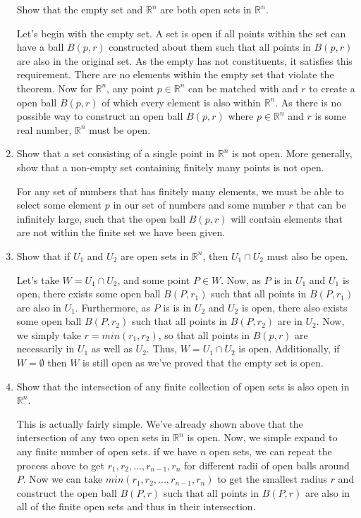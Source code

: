 \documentclass[11pt]{article}
\begin{document}
\begin{enumerate}[label=(\alph*)]
	Show that the empty set and $\mathbb{R}^n$ are both open sets in $\mathbb{R}^n$.
	
	Let's begin with the empty set. A set is open if all points within the set can have a ball $B(p,r)$ constructed about them such that all points in $B(p,r)$ are also in the original set. As the empty has not constituents, it satisfies this requirement. There are no elements within the empty set that violate the theorem. Now for $\mathbb{R}^n$, any point $p \in \mathbb{R}^n$ can be matched with and $r$ to create a open ball $B(p,r)$ of which every element is also within $\mathbb{R}^n$. As there is no possible way to construct an open ball $B(p,r)$ where $p \in \mathbb{R}^n$ and $r$ is some real number, $\mathbb{R}^n$ must be open.
	
	\item
	
	Show that a set consisting of a single point in $\mathbb{R}^n$ is not open. More generally, show that a non-empty set containing finitely many points is not open.
	
	For any set of numbers that has finitely many elements, we must be able to select some element $p$ in our set of numbers and some number $r$ that can be infinitely large, such that the open ball $B(p,r)$ will contain elements that are not within the finite set we have been given.
	
	\item
	
	Show that if $U_1$ and $U_2$ are open sets in $\mathbb{R}^n$, then $U_1 \cap U_2$ must also be open.
	
	Let's take $W = U_1 \cap U_2$, and some point $P \in W$. Now, as $P$ is in $U_1$ and $U_1$ is open, there exists some open ball $B(P,r_1)$ such that all points in $B(P,r_1)$  are also in $U_1$. Furthermore, as $P$ is is in $U_2$ and $U_2$ is open, there also exists some open ball $B(P,r_2)$ such that all points in $B(P,r_2)$ are in $U_2$. Now, we simply take $r = min(r_1,r_2)$, so that all points in $B(p,r)$ are necessarily in $U_1$ as well as $U_2$. Thus, $W = U_1 \cap U_2$ is open. Additionally, if $W = \emptyset$ then $W$ is still open as we've proved that the empty set is open.
	
	\item
	
	Show that the intersection of any finite collection of open sets is also open in $\mathbb{R}^n$.
	
	This is actually fairly simple. We've already shown above that the intersection of any two open sets in $\mathbb{R}^n$ is open. Now, we simple expand to any finite number of open sets. if we have $n$ open sets, we can repeat the process above to get $r_1,r_2,...,r_{n-1},r_n$ for different radii of open balls around $P$. Now we can take $min(r_1,r_2,...,r_{n-1},r_n)$ to get the smallest radius $r$ and construct the open ball $B(P,r)$ such that all points in $B(P,r)$ are also in all of the finite open sets and thus in their intersection.
	

\end{enumerate}
\end{document}
